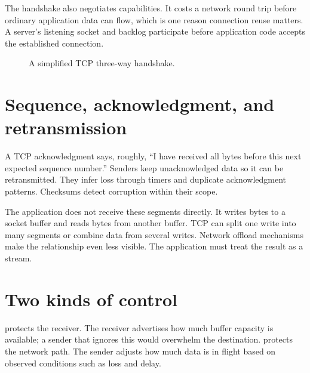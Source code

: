 The handshake also negotiates capabilities. It costs a network round trip before
ordinary application data can flow, which is one reason connection reuse matters.
A server's listening socket and backlog participate before application code
accepts the established connection.

\begin{figure}[htbp]
\centering
{}
\caption{A simplified TCP three-way handshake.}
\label{fig:tcp-handshake}
\end{figure}

\section{Sequence, acknowledgment, and retransmission}

A TCP acknowledgment says, roughly, ``I have received all bytes before this
next expected sequence number.'' Senders keep unacknowledged data so it can be
retransmitted. They infer loss through timers and duplicate acknowledgment
patterns. Checksums detect corruption within their scope.

The application does not receive these segments directly. It writes bytes to a
socket buffer and reads bytes from another buffer. TCP can split one write into
many segments or combine data from several writes. Network offload mechanisms
make the relationship even less visible. The application must treat the result
as a stream.

\section{Two kinds of control}

 protects the receiver. The receiver advertises how much
buffer capacity is available; a sender that ignores this would overwhelm the
destination.  protects the network path. The sender
adjusts how much data is in flight based on observed conditions such as loss
and delay.

